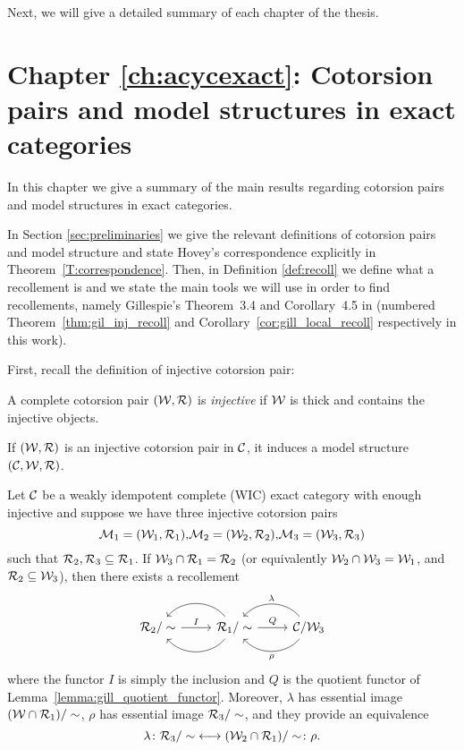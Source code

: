 Next, we will give a detailed summary of each chapter of the thesis.

\section*{Chapter \ref{ch:acycexact}: Cotorsion pairs and model structures in exact categories}

In this chapter we give a summary of the main results regarding cotorsion pairs and model structures in exact categories.

In Section \ref{sec:preliminaries} we give the relevant definitions of cotorsion pairs and model structure and state Hovey's correspondence explicitly in Theorem~\ref{T:correspondence}.
Then, in Definition \ref{def:recoll} we define what a recollement is and we state the main tools we will use in order to find recollements, namely Gillespie's Theorem~3.4 and Corollary~4.5 in \cite{G7} (numbered Theorem~\ref{thm:gil_inj_recoll} and Corollary~\ref{cor:gill_local_recoll} respectively in this work).

First, recall the definition of injective cotorsion pair:
\begin{nonlisting_def}
  A complete cotorsion pair $(\mathcal{W},\mathcal{R})$ is \emph{injective} if $\mathcal{W}$ is thick and contains the injective objects.

  If $(\mathcal{W},\mathcal{R})$ is an injective cotorsion pair in $\mathcal{C}$, it induces a model structure $(\mathcal{C},\mathcal{W},\mathcal{R})$.
\end{nonlisting_def}

\begin{nonlisting_thm}[\ref{thm:gil_inj_recoll}]
  Let $\mathcal{C}$ be a weakly idempotent complete (WIC) exact category with enough injective and suppose we have three injective cotorsion pairs
  \[
    \M_1=(\W_1,\R_1)\text{,\hfill}\M_2=(\W_2,\R_2)\text{,\hfill}\M_3=(\W_3,\R_3)
  \]
  such that $\mathcal{R}_2,\mathcal{R}_3\subseteq \mathcal{R}_1$. If $\mathcal{W}_3\cap\mathcal{R}_1=\mathcal{R}_2$ (or equivalently $\mathcal{W}_2\cap\mathcal{W}_3=\mathcal{W}_1$, and $\mathcal{R}_2\subseteq \mathcal{W}_3$), then there exists a recollement
  \begin{equation*}
    \begin{tikzcd}
      {\R_2/\sim}\arrow{r}{I}
      & {\R_1/\sim}\arrow[bend left=50]{l}\arrow[bend right=50]{l}\arrow{r}{Q}
      & \C/\W_3\arrow[bend left=50]{l}{\rho}\arrow[bend right=50]{l}[']{\lambda}
    \end{tikzcd}
  \end{equation*}
  where the functor $I$ is simply the inclusion and $Q$ is the quotient functor of Lemma~\ref{lemma:gill_quotient_functor}. Moreover, $\lambda$ has essential image $(\mathcal{W}\cap\mathcal{R}_1)/\sim$, $\rho$ has essential image ${\mathcal{R}_3/\sim}$, and they provide an equivalence \[\lambda\colon{\mathcal{R}_3/\sim} \longleftrightarrow (\mathcal{W}_2\cap\mathcal{R}_1)/\sim\colon\rho.\]
\end{nonlisting_thm}

